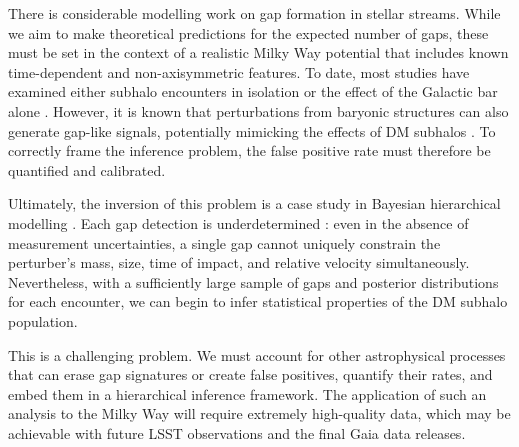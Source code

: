         There is considerable modelling work on gap formation in stellar streams. While we aim to make theoretical predictions for the expected number of gaps, these must be set in the context of a realistic Milky Way potential that includes known time-dependent and non-axisymmetric features. To date, most studies have examined either subhalo encounters in isolation \citep{2013ApJ...775...90C,2015MNRAS.450.1136E,2016MNRAS.463..102E,2016MNRAS.457.3817S,2024arXiv241213144A,2025arXiv250207781L} or the effect of the Galactic bar alone \citep{2016MNRAS.460..497H,2016ApJ...824..104P,2017NatAs...1..633P,2023A&A...678A.180T}. However, it is known that perturbations from baryonic structures can also generate gap-like signals, potentially mimicking the effects of DM subhalos \citep{2020ApJ...891..161I}. To correctly frame the inference problem, the false positive rate must therefore be quantified and calibrated.

        Ultimately, the inversion of this problem is a case study in Bayesian hierarchical modelling \citep{2020sdmm.book.....I}. Each gap detection is underdetermined \citep{2015MNRAS.450.1136E}: even in the absence of measurement uncertainties, a single gap cannot uniquely constrain the perturber's mass, size, time of impact, and relative velocity simultaneously. Nevertheless, with a sufficiently large sample of gaps and posterior distributions for each encounter, we can begin to infer statistical properties of the DM subhalo population.

        This is a challenging problem. We must account for other astrophysical processes that can erase gap signatures or create false positives, quantify their rates, and embed them in a hierarchical inference framework. The application of such an analysis to the Milky Way will require extremely high-quality data, which may be achievable with future LSST observations and the final Gaia data releases.

